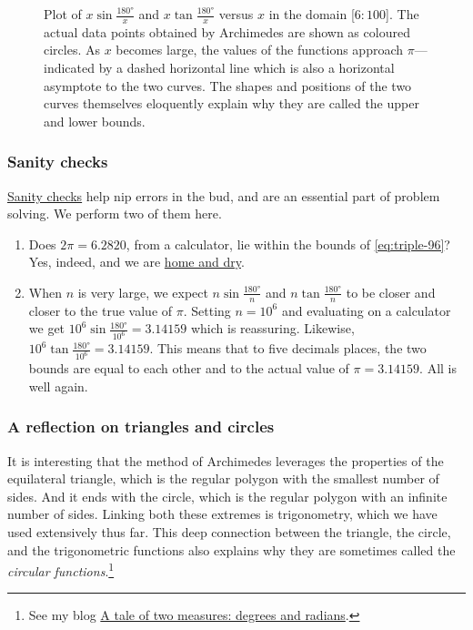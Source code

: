 \documentclass[
  a4paper,
]{article}
\begin{document}
\begin{figure}
\centering

\caption{Plot of \(x\sin\frac{180°}{x}\) and \(x\tan\frac{180°}{x}\)
versus \(x\) in the domain {[}\(6:100\){]}. The actual data points
obtained by Archimedes are shown as coloured circles. As \(x\) becomes
large, the values of the functions approach \(\pi\)---indicated by a
dashed horizontal line which is also a horizontal asymptote to the two
curves. The shapes and positions of the two curves themselves eloquently
explain why they are called the upper and lower bounds.}\label{fig:plot}
\end{figure}

\subsubsection{Sanity checks}\label{sanity-checks}

\href{https://en.wiktionary.org/wiki/sanity_check}{Sanity checks} help
nip errors in the bud, and are an essential part of problem solving. We
perform two of them here.

\begin{enumerate}
\item
  Does \(2\pi = 6.2820\), from a calculator, lie within the bounds of
  \cref{eq:triple-96}? Yes, indeed, and we are
  \href{https://dictionary.cambridge.org/dictionary/english/be-home-and-dry}{home
  and dry}.
\item
  When \(n\) is very large, we expect \(n\sin\frac{180°}{n}\) and
  \(n\tan\frac{180°}{n}\) to be closer and closer to the true value of
  \(\pi\). Setting \(n = 10^6\) and evaluating on a calculator we get
  \(10^6\sin\frac{180°}{10^6} = 3.14159\) which is reassuring. Likewise,
  \(10^6\tan\frac{180°}{10^6} = 3.14159\). This means that to five
  decimals places, the two bounds are equal to each other and to the
  actual value of \(\pi = 3.14159\). All is well again.
\end{enumerate}

\subsubsection{A reflection on triangles and
circles}\label{a-reflection-on-triangles-and-circles}

It is interesting that the method of Archimedes leverages the properties
of the equilateral triangle, which is the regular polygon with the
smallest number of sides. And it ends with the circle, which is the
regular polygon with an infinite number of sides. Linking both these
extremes is trigonometry, which we have used extensively thus far. This
deep connection between the triangle, the circle, and the trigonometric
functions also explains why they are sometimes called the \emph{circular
functions}.\footnote{See my blog
  \href{https://swanlotus.netlify.app/blogs/a-tale-of-two-measures-degrees-and-radians}{A
  tale of two measures: degrees and radians}.}
\end{document}
